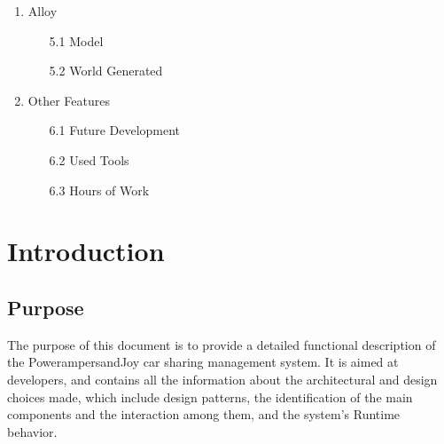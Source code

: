 \documentclass{article}
\begin{document}
\begin{enumerate}
\item Alloy
\begin {enumerate}
\item [5.1] Model  
\item [5.2] World Generated

\end {enumerate} 


\item Other Features
\begin {enumerate}
\item [6.1] Future Development
\item [6.2] Used Tools
\item [6.3] Hours of Work

\end {enumerate} 

\end{enumerate}

\newpage   %
  
  \section{Introduction}


\subsection{Purpose}%

The purpose of this document is to provide a detailed functional description of the Power{ampersand}Joy car sharing management system. It is aimed at developers, and contains all the information about the architectural and design choices made, which include design patterns, the identification of the main components and the interaction among them, and the system's Runtime behavior.   
  
\end{document}
